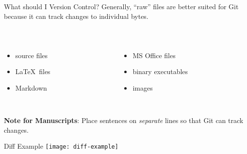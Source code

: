 \documentclass{beamer}
\begin{document}
\begin{frame}{What should I Version Control?}
  Generally, ``raw'' files are better suited for Git because it can track changes to individual bytes.

  \hfill \\

  \begin{columns}
    \begin{column}{0.5\textwidth}
      \begin{itemize}
        \item source files

        \item \LaTeX\ files

        \item Markdown
      \end{itemize}
    \end{column}

    \begin{column}{0.5\textwidth}
      \begin{itemize}
        \item MS Office files

        \item binary executables

        \item images
      \end{itemize}
    \end{column}
  \end{columns}

  \hfill \\
  
  \textbf{Note for Manuscripts}: Place sentences on \textit{separate} lines so that Git can track changes.
\end{frame}

\begin{frame}{Diff Example}
  \center
  \texttt{[image: diff-example]}
\end{frame}
\end{document}
